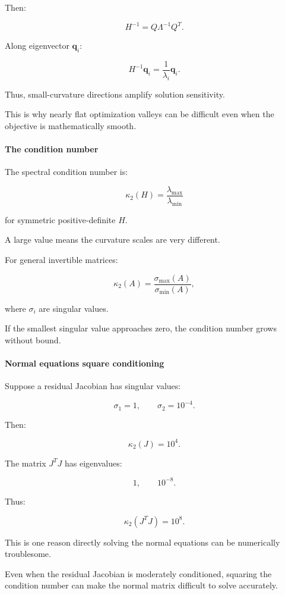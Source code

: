 Then:

\[
H^{-1}=Q\Lambda^{-1}Q^T.
\]

Along eigenvector \(\mathbf q_i\):

\[
H^{-1}\mathbf q_i= \frac1{\lambda_i}\mathbf q_i.
\]

Thus, small-curvature directions amplify solution sensitivity.

This is why nearly flat optimization valleys can be difficult even when the objective is mathematically smooth.

\paragraph{The condition number}\label{02-foundations-ii-ch027-the-condition-number}

The spectral condition number is:

\[
\boxed{ \kappa_2(H)= \frac{\lambda_{\max}}{\lambda_{\min}} }
\]

for symmetric positive-definite \(H\).

A large value means the curvature scales are very different.

For general invertible matrices:

\[
\kappa_2(A)= \frac{\sigma_{\max}(A)}{\sigma_{\min}(A)},
\]

where \(\sigma_i\) are singular values.

If the smallest singular value approaches zero, the condition number grows without bound.

\paragraph{Normal equations square conditioning}\label{02-foundations-ii-ch027-normal-equations-square-conditioning}

Suppose a residual Jacobian has singular values:

\[
\sigma_1=1,\qquad\sigma_2=10^{-4}.
\]

Then:

\[
\kappa_2(J)=10^4.
\]

The matrix \(J^TJ\) has eigenvalues:

\[
1,\qquad10^{-8}.
\]

Thus:

\[
\boxed{\kappa_2(J^TJ)=10^8}.
\]

This is one reason directly solving the normal equations can be numerically troublesome.

Even when the residual Jacobian is moderately conditioned, squaring the condition number can make the normal matrix difficult to solve accurately.

